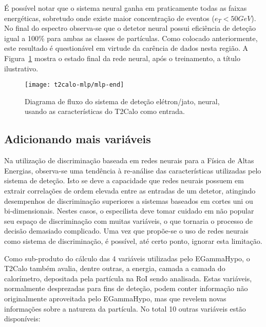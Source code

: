 É possível notar que o sistema neural ganha em praticamente todas as faixas
energéticas, sobretudo onde existe maior concentração de eventos ($e_T<50
GeV$). No final do espectro observa-se que o detetor neural possui eficiência
de deteção igual a 100\% para ambas as classes de partículas. Como colocado
anteriormente, este resultado é questionável em virtude da carência de dados
nesta região. A Figura~\ref{fig:t2calo-mlp-best-net} mostra o estado final da
rede neural, após o treinamento, a título ilustrativo.

\begin{figure}
\begin{center}
\begin{sideways}
\texttt{[image: t2calo-mlp/mlp-end]}
\end{sideways}
\end{center}
\caption{Diagrama de fluxo do sistema de deteção elétron/jato, neural, usando as
características do T2Calo como entrada.}
\label{fig:t2calo-mlp-best-net}
\end{figure}

\subsection{Adicionando mais variáveis}

Na utilização de discriminação baseada em redes neurais para a Física de Altas
Energias, observa-se uma tendência à re-análise das características utilizadas
pelo sistema de deteção. Isto se deve a capacidade que redes neurais possuem
em extrair correlações de ordem elevada entre as entradas de um detetor,
atingindo desempenhos de discriminação superiores a sistemas baseados em
cortes uni ou bi-dimensionais. Nestes casos, o especilista deve tomar cuidado
em não popular seu espaço de discriminação com muitas variáveis, o que
tornaria o processo de decisão demasiado complicado. Uma vez que propõe-se o
uso de redes neurais como sistema de discriminação, é possível, até certo
ponto, ignorar esta limitação.

Como sub-produto do cálculo das 4 variáveis utilizadas pelo EGammaHypo, o
T2Calo também avalia, dentre outras, a energia, camada a camada do
calorímetro, depositada pela partícula na RoI sendo analisada. Estas
variáveis, normalmente desprezadas para fins de deteção, podem conter
informação não originalmente aproveitada pelo EGammaHypo, mas que revelem
novas informações sobre a natureza da partícula. No total 10 outras variáveis
estão disponíveis:

